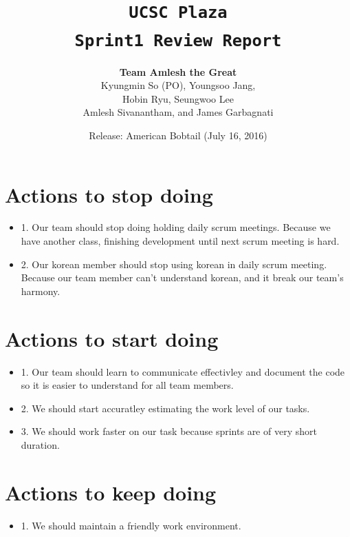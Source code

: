 \documentclass[10pt]{article}
\title{\color{primary}\texttt{UCSC Plaza \\ Sprint1 Review Report}}
\author{{\color{secondary}\textbf{Team Amlesh the Great}} \\ Kyungmin So (PO), Youngsoo Jang, \\ Hobin Ryu, Seungwoo Lee \\ Amlesh Sivanantham, and James Garbagnati }
\date{Release: American Bobtail (July 16, 2016)}
\newcommand{\fancysecX}[2] {{\color{primary}\section*{#1} \label{sec:#2}}}
\newcommand{\fancysubX}[2] {{\color{primary}\subsection*{#1} \label{sec:#2}}}
\begin{document}
\maketitle
    
\fancysecX{Actions to stop doing}{stop}
     
        \begin{itemize}
            \item 1. Our team should stop doing holding daily scrum meetings. Because we have another class, finishing development until next scrum meeting is hard.
            \item 2. Our korean member should stop using korean in daily scrum meeting. Because our team member can’t understand korean, and it break our team’s harmony.
        \end{itemize}    

\fancysecX{Actions to start doing}{start}
     
        \begin{itemize}
            \item 1. Our team should learn to communicate effectivley and document the code so it is easier to understand for all team members.
            \item 2. We should start accuratley estimating the work level of our tasks.
            \item 3. We should work faster on our task because sprints are of very short duration.
	\end{itemize}

\fancysecX{Actions to keep doing}{keep}
     
        \begin{itemize}
            \item 1. We should maintain a friendly work environment.
	\end{itemize}
        
         
\end{document}
